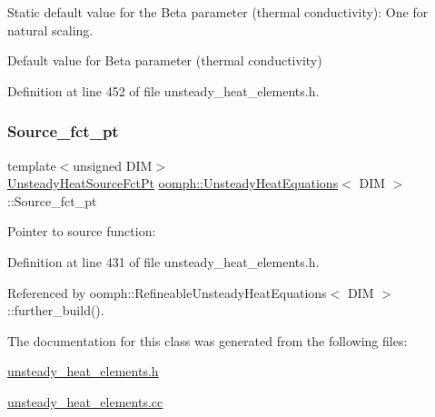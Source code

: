 Static default value for the Beta parameter (thermal conductivity)\+: One for natural scaling. 

Default value for Beta parameter (thermal conductivity) 

Definition at line 452 of file unsteady\+\_\+heat\+\_\+elements.\+h.

\mbox{\label{classoomph_1_1UnsteadyHeatEquations_a775c7525ac08c848d6c980c1913f1e12}} 
\subsubsection{\texorpdfstring{Source\+\_\+fct\+\_\+pt}{Source\_fct\_pt}}
{\footnotesize\ttfamily template$<$unsigned D\+IM$>$ \\
\hyperlink{classoomph_1_1UnsteadyHeatEquations_a967135cc2be2cb4b16fe0dc0b4d68a68}{Unsteady\+Heat\+Source\+Fct\+Pt} \hyperlink{classoomph_1_1UnsteadyHeatEquations}{oomph\+::\+Unsteady\+Heat\+Equations}$<$ D\+IM $>$\+::Source\+\_\+fct\+\_\+pt\hspace{0.3cm}{\ttfamily [protected]}}



Pointer to source function\+: 



Definition at line 431 of file unsteady\+\_\+heat\+\_\+elements.\+h.



Referenced by oomph\+::\+Refineable\+Unsteady\+Heat\+Equations$<$ D\+I\+M $>$\+::further\+\_\+build().



The documentation for this class was generated from the following files\+:\begin{DoxyCompactItemize}
\item 
\hyperlink{unsteady__heat__elements_8h}{unsteady\+\_\+heat\+\_\+elements.\+h}\item 
\hyperlink{unsteady__heat__elements_8cc}{unsteady\+\_\+heat\+\_\+elements.\+cc}\end{DoxyCompactItemize}
